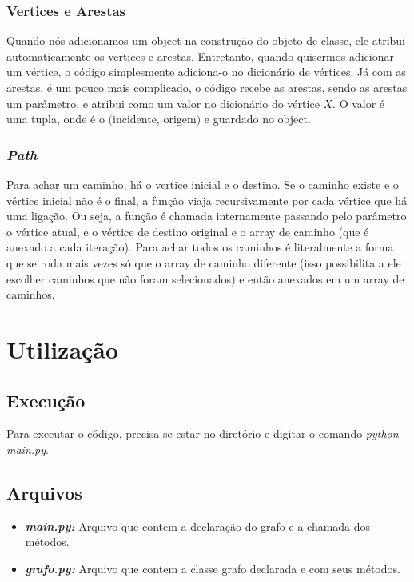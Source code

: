 \documentclass[12pt]{article}
\begin{document}
\subsubsection{Vertices e Arestas}
Quando nós adicionamos um object na construção do objeto de classe, ele atribui automaticamente os vertices e arestas.
Entretanto, quando quisermos adicionar um vértice, o código simplesmente adiciona-o no dicionário de vértices.
Já com as arestas, é um pouco mais complicado, o código recebe as arestas, sendo as arestas um parâmetro, e atribui como um valor no dicionário do vértice $X$.
O valor é uma tupla, onde é o $($incidente, origem$)$ e guardado no object.

\subsubsection{\textit{Path}}
Para achar um caminho, há o vertice inicial e o destino. 
Se o caminho existe e o vértice inicial não é o final, a função viaja recursivamente por cada vértice que há uma ligação.
Ou seja, a função é chamada internamente passando pelo parâmetro o vértice atual, e o vértice de destino original e o array de caminho (que é anexado a cada iteração).
Para achar todos os caminhos é literalmente a forma que se roda mais vezes só que o array de caminho diferente (isso possibilita a ele escolher caminhos que não foram selecionados) e então anexados em um array de caminhos.


\section{Utilização}
\subsection{Execução}
Para executar o código, precisa-se estar no diretório  e digitar o comando \textit{python main.py}.

\subsection{Arquivos}
\begin{itemize}
	\item \textbf{\textit{main.py:}}
	      Arquivo que contem a declaração do grafo e a chamada dos métodos.
	\item \textbf{\textit{grafo.py:}}
	      Arquivo que contem a classe grafo declarada e com seus métodos.
\end{itemize}
\end{document}
